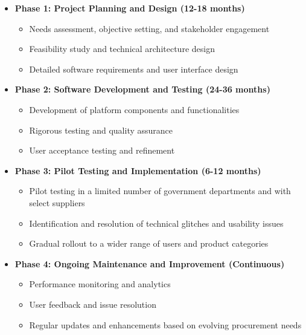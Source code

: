 \begin{itemize}
    \item \textbf{Phase 1: Project Planning and Design (12-18 months)}
    
    \begin{itemize}
        \item Needs assessment, objective setting, and stakeholder engagement
        \item Feasibility study and technical architecture design
        \item Detailed software requirements and user interface design
    \end{itemize}
    
    \item \textbf{Phase 2: Software Development and Testing (24-36 months)}
    
    \begin{itemize}
        \item Development of platform components and functionalities
        \item Rigorous testing and quality assurance
        \item User acceptance testing and refinement
    \end{itemize}
    
    \item \textbf{Phase 3: Pilot Testing and Implementation (6-12 months)}
    
    \begin{itemize}
        \item Pilot testing in a limited number of government departments and with select suppliers
        \item Identification and resolution of technical glitches and usability issues
        \item Gradual rollout to a wider range of users and product categories
    \end{itemize}
    
    \item \textbf{Phase 4: Ongoing Maintenance and Improvement (Continuous)}
    
    \begin{itemize}
        \item Performance monitoring and analytics
        \item User feedback and issue resolution
        \item Regular updates and enhancements based on evolving procurement needs
    \end{itemize}
\end{itemize}
